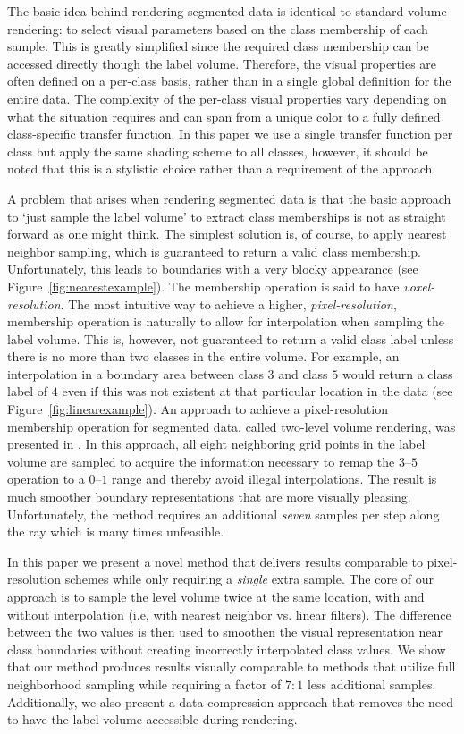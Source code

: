 \documentclass{egpubl}
\begin{document}
The basic idea behind rendering segmented data is identical to standard volume rendering: to select visual parameters based on the class membership of each sample. This is greatly simplified since the required class membership can be accessed directly though the label volume. Therefore, the visual properties are often defined on a per-class basis, rather than in a single global definition for the entire data. The complexity of the per-class visual properties vary depending on what the situation requires and can span from a unique color to a fully defined class-specific transfer function. In this paper we use a single transfer function per class but apply the same shading scheme to all classes, however, it should be noted that this is a stylistic choice rather than a requirement of the approach.

A problem that arises when rendering segmented data is that the basic approach to `just sample the label volume' to extract class memberships is not as straight forward as one might think. The simplest solution is, of course, to apply nearest neighbor sampling, which is guaranteed to return a valid class membership. Unfortunately, this leads to boundaries with a very blocky appearance (see Figure~\ref{fig:nearestexample}). The membership operation is said to have \emph{voxel-resolution}. The most intuitive way to achieve a higher, \emph{pixel-resolution}, membership operation is naturally to allow for interpolation when sampling the label volume. This is, however, not guaranteed to return a valid class label unless there is no more than two classes in the entire volume. For example, an interpolation in a boundary area between class $3$ and class $5$ would return a class label of $4$ even if this was not existent at that particular location in the data (see Figure~\ref{fig:linearexample}). An approach to achieve a pixel-resolution membership operation for segmented data, called two-level volume rendering, was presented in \cite{Hadwiger2003}. In this approach, all eight neighboring grid points in the label volume are sampled to acquire the information necessary to remap the $3$--$5$ operation to a $0$--$1$ range and thereby avoid illegal interpolations. The result is much smoother boundary representations that are more visually pleasing. Unfortunately, the method requires an additional \emph{seven} samples per step along the ray which is many times unfeasible.

In this paper we present a novel method that delivers results comparable to pixel-resolution schemes while only requiring a \emph{single} extra sample. The core of our approach is to sample the level volume twice at the same location, with and without interpolation (i.e, with nearest neighbor vs. linear filters). The difference between the two values is then used to smoothen the visual representation near class boundaries without creating incorrectly interpolated class values. We show that our method produces results visually comparable to methods that utilize full neighborhood sampling while requiring a factor of $7:1$ less additional samples. Additionally, we also present a data compression approach that removes the need to have the label volume accessible during rendering.
\end{document}
